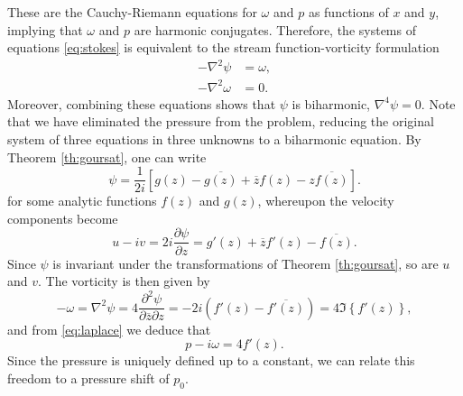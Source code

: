 \documentclass{article}
\newcommand{\conj}[1]{{\overline{#1}}}
\begin{document}
These are the Cauchy-Riemann equations for $\omega$ and $p$ as functions of $x$
and $y$, implying that $\omega$ and $p$ are harmonic conjugates. Therefore, the
systems of equations \eqref{eq:stokes} is equivalent to the stream
function-vorticity formulation
\begin{subequations}
\begin{align}
-\nabla^2\psi &= \omega,\\
-\nabla^2\omega &= 0.\label{eq:laplace}
\end{align}
\end{subequations}
Moreover, combining these equations shows that $\psi$ is biharmonic, $\nabla^4
\psi=0$. Note that we have eliminated the pressure from the problem, reducing
the original system of three equations in three unknowns to a biharmonic
equation. By Theorem \ref{th:goursat}, one can write
\begin{equation}
\psi = \frac{1}{2i} \left[g(z) - \conj{g(z)} + \conj{z}f(z) - z\conj{f(z)}\right].
\end{equation}
for some analytic functions $f(z)$ and $g(z)$, whereupon the velocity components become
\begin{equation}
u-iv = 2i\frac{\partial \psi}{\partial z} = g'(z) + \conj{z} f'(z) - \conj{f(z)}.
\end{equation}
Since $\psi$ is invariant under the transformations of Theorem
\ref{th:goursat}, so are $u$ and $v$. The vorticity is then given by
\begin{equation}
-\omega = \nabla^2 \psi = 4\frac{\partial^2\psi}{\partial \conj{z}\partial z} 
   = -2i \left( f'(z) - \conj{f'(z)}\right) = 4\Im\left\{f'(z)\right\},
\end{equation}
and from \eqref{eq:laplace} we deduce that
\begin{equation}
p-i\omega = 4 f'(z).
\end{equation}
Since the pressure is uniquely defined up to a constant, we can relate this
freedom to a pressure shift of $p_0$. 
\end{document}
